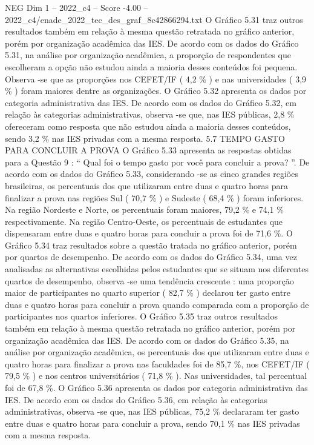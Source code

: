 \begin{textsample}{NEG Dim 1 – 2022\_c4 – Score -4.00 – 2022\_c4/enade\_2022\_tec\_des\_graf\_8c42866294.txt}
O Gráfico 5.31 traz outros resultados também em relação à mesma questão retratada no gráfico anterior, porém por organização acadêmica das IES.
De acordo com os dados do Gráfico 5.31, na análise por organização acadêmica, a proporção de respondentes que escolheram a opção não estudou ainda a maioria desses conteúdos foi pequena.
Observa -se que as proporções nos CEFET/IF ( 4,2 \% ) e nas universidades ( 3,9 \% ) foram maiores dentre as organizações.
O Gráfico 5.32 apresenta os dados por categoria administrativa das IES.
De acordo com os dados do Gráfico 5.32, em relação às categorias administrativas, observa -se que, nas IES públicas, 2,8 \% ofereceram como resposta que não estudou ainda a maioria desses conteúdos, sendo 3,2 \% nas IES privadas com a mesma resposta. 5.7 TEMPO GASTO PARA CONCLUIR A PROVA O Gráfico 5.33 apresenta as respostas obtidas para a Questão 9 : “ Qual foi o tempo gasto por você para concluir a prova? ”.
De acordo com os dados do Gráfico 5.33, considerando -se as cinco grandes regiões brasileiras, os percentuais dos que utilizaram entre duas e quatro horas para finalizar a prova nas regiões Sul ( 70,7 \% ) e Sudeste ( 68,4 \% ) foram inferiores.
Na região Nordeste e Norte, os percentuais foram maiores, 79,2 \% e 74,1 \% respectivamente.
Na região Centro-Oeste, os percentuais de estudantes que dispensaram entre duas e quatro horas para concluir a prova foi de 71,6 \%.
O Gráfico 5.34 traz resultados sobre a questão tratada no gráfico anterior, porém por quartos de desempenho.
De acordo com os dados do Gráfico 5.34, uma vez analisadas as alternativas escolhidas pelos estudantes que se situam nos diferentes quartos de desempenho, observa -se uma tendência crescente : uma proporção maior de participantes no quarto superior ( 82,7 \% ) declarou ter gasto entre duas e quatro horas para concluir a prova quando comparada com a proporção de participantes nos quartos inferiores.
O Gráfico 5.35 traz outros resultados também em relação à mesma questão retratada no gráfico anterior, porém por organização acadêmica das IES.
De acordo com os dados do Gráfico 5.35, na análise por organização acadêmica, os percentuais dos que utilizaram entre duas e quatro horas para finalizar a prova nas faculdades foi de 85,7 \%, nos CEFET/IF ( 79,5 \% ) e nos centros universitários ( 71,8 \% ).
Nas universidades, tal percentual foi de 67,8 \%.
O Gráfico 5.36 apresenta os dados por categoria administrativa das IES.
De acordo com os dados do Gráfico 5.36, em relação às categorias administrativas, observa -se que, nas IES públicas, 75,2 \% declararam ter gasto entre duas e quatro horas para concluir a prova, sendo 70,1 \% nas IES privadas com a mesma resposta.

\end{textsample}
